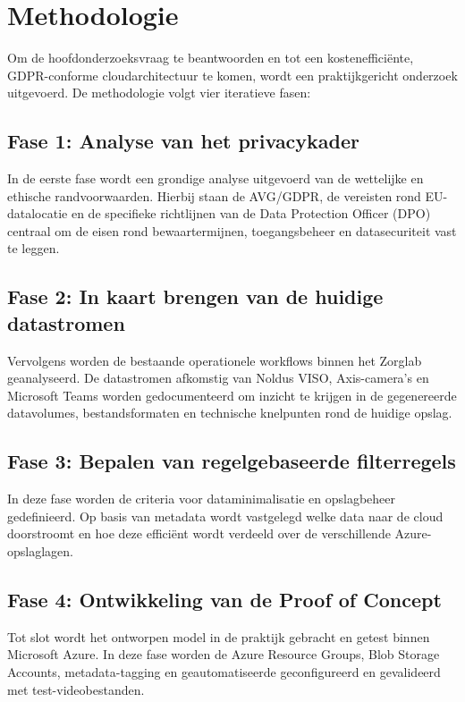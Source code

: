\section{Methodologie}%
\label{sec:methodologie}

Om de hoofdonderzoeksvraag te beantwoorden en tot een kostenefficiënte, GDPR-conforme cloudarchitectuur te komen, wordt een praktijkgericht onderzoek uitgevoerd. De methodologie volgt vier iteratieve fasen:

\subsection{Fase 1: Analyse van het privacykader}
In de eerste fase wordt een grondige analyse uitgevoerd van de wettelijke en ethische randvoorwaarden. Hierbij staan de AVG/GDPR, de vereisten rond EU-datalocatie en de specifieke richtlijnen van de Data Protection Officer (DPO) centraal om de eisen rond bewaartermijnen, toegangsbeheer en datasecuriteit vast te leggen.

\subsection{Fase 2: In kaart brengen van de huidige datastromen}
Vervolgens worden de bestaande operationele workflows binnen het Zorglab geanalyseerd. De datastromen afkomstig van Noldus VISO, Axis-camera's en Microsoft Teams worden gedocumenteerd om inzicht te krijgen in de gegenereerde datavolumes, bestandsformaten en technische knelpunten rond de huidige opslag.

\subsection{Fase 3: Bepalen van regelgebaseerde filterregels}
In deze fase worden de criteria voor dataminimalisatie en opslagbeheer gedefinieerd. Op basis van metadata wordt vastgelegd welke data naar de cloud doorstroomt en hoe deze efficiënt wordt verdeeld over de verschillende Azure-opslaglagen.

\subsection{Fase 4: Ontwikkeling van de Proof of Concept}
Tot slot wordt het ontworpen model in de praktijk gebracht en getest binnen Microsoft Azure. In deze fase worden de Azure Resource Groups, Blob Storage Accounts, metadata-tagging en geautomatiseerde geconfigureerd en gevalideerd met test-videobestanden.


